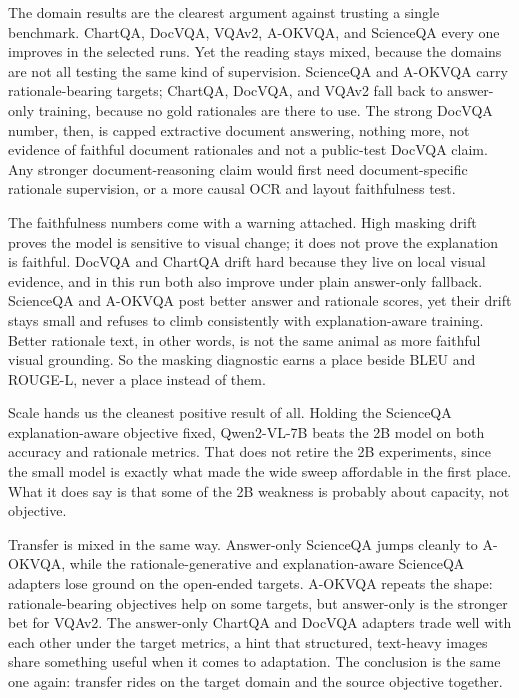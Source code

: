 \documentclass[preprint,12pt]{elsarticle}
\begin{document}
The domain results are the clearest argument against trusting a single benchmark.
ChartQA, DocVQA, VQAv2, A-OKVQA, and ScienceQA every one improves in the selected runs.
Yet the reading stays mixed, because the domains are not all testing the same kind of supervision.
ScienceQA and A-OKVQA carry rationale-bearing targets; ChartQA, DocVQA, and VQAv2 fall back to answer-only training, because no gold rationales are there to use.
The strong DocVQA number, then, is capped extractive document answering, nothing more, not evidence of faithful document rationales and not a public-test DocVQA claim.
Any stronger document-reasoning claim would first need document-specific rationale supervision, or a more causal OCR and layout faithfulness test.

The faithfulness numbers come with a warning attached.
High masking drift proves the model is sensitive to visual change; it does not prove the explanation is faithful.
DocVQA and ChartQA drift hard because they live on local visual evidence, and in this run both also improve under plain answer-only fallback.
ScienceQA and A-OKVQA post better answer and rationale scores, yet their drift stays small and refuses to climb consistently with explanation-aware training.
Better rationale text, in other words, is not the same animal as more faithful visual grounding.
So the masking diagnostic earns a place beside BLEU and ROUGE-L, never a place instead of them.

Scale hands us the cleanest positive result of all.
Holding the ScienceQA explanation-aware objective fixed, Qwen2-VL-7B beats the 2B model on both accuracy and rationale metrics.
That does not retire the 2B experiments, since the small model is exactly what made the wide sweep affordable in the first place.
What it does say is that some of the 2B weakness is probably about capacity, not objective.

Transfer is mixed in the same way.
Answer-only ScienceQA jumps cleanly to A-OKVQA, while the rationale-generative and explanation-aware ScienceQA adapters lose ground on the open-ended targets.
A-OKVQA repeats the shape: rationale-bearing objectives help on some targets, but answer-only is the stronger bet for VQAv2.
The answer-only ChartQA and DocVQA adapters trade well with each other under the target metrics, a hint that structured, text-heavy images share something useful when it comes to adaptation.
The conclusion is the same one again: transfer rides on the target domain and the source objective together.
\end{document}
